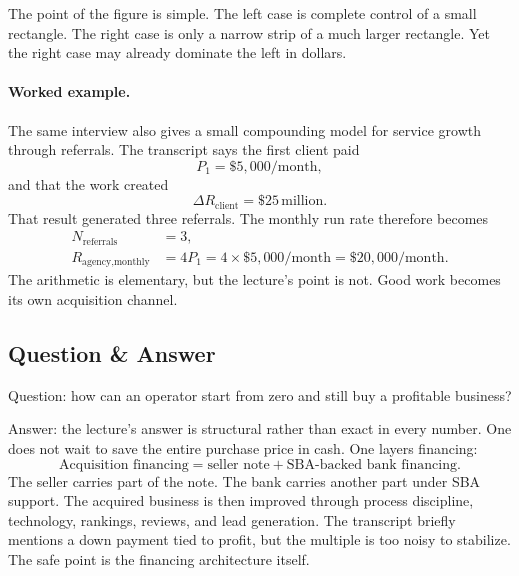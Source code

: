 \begin{figure}[h]
\centering
{}
\end{figure}

The point of the figure is simple. The left case is complete control of a small rectangle. The right case is only a narrow strip of a much larger rectangle. Yet the right case may already dominate the left in dollars.

\paragraph{Worked example.}
The same interview also gives a small compounding model for service growth through referrals. The transcript says the first client paid
\begin{equation}
P_1 = \$5{,}000/\text{month},
\end{equation}
and that the work created
\begin{equation}
\Delta R_{\text{client}} = \$25\,\text{million}.
\end{equation}
That result generated three referrals. The monthly run rate therefore becomes
\begin{align}
N_{\text{referrals}} &= 3, \\
R_{\text{agency,monthly}} &= 4P_1 = 4\times \$5{,}000/\text{month} = \$20{,}000/\text{month}.
\end{align}
The arithmetic is elementary, but the lecture's point is not. Good work becomes its own acquisition channel.

\subsection{Question \& Answer}

Question: how can an operator start from zero and still buy a profitable business?

Answer: the lecture's answer is structural rather than exact in every number. One does not wait to save the entire purchase price in cash. One layers financing:
\begin{equation}
\text{Acquisition financing} = \text{seller note} + \text{SBA-backed bank financing}.
\end{equation}
The seller carries part of the note. The bank carries another part under SBA support. The acquired business is then improved through process discipline, technology, rankings, reviews, and lead generation. The transcript briefly mentions a down payment tied to profit, but the multiple is too noisy to stabilize. The safe point is the financing architecture itself.

